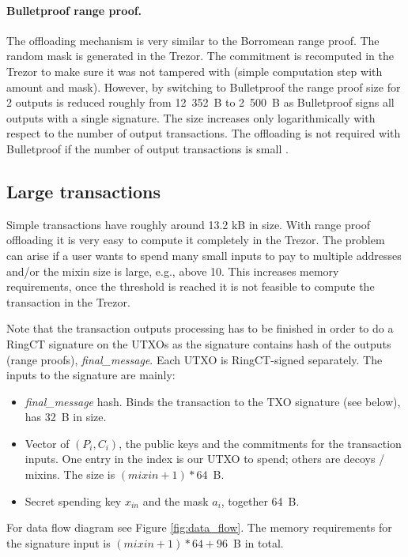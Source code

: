 \documentclass[]{article}
\begin{document}
\paragraph{Bulletproof range proof.} The offloading mechanism is very similar to the Borromean range proof. The random mask is generated in the Trezor. The commitment is recomputed in the Trezor to make sure it was not tampered with (simple computation step with amount and mask). 
However, by switching to Bulletproof the range proof size for 2 outputs is reduced roughly from 12~352~B to 2~500~B as Bulletproof signs all outputs with a single signature. The size increases only logarithmically with respect to the number of output transactions. The offloading is not required with Bulletproof if the number of output transactions is small \cite{Bnz2017BulletproofsSP}.

\subsection{Large transactions}
Simple transactions have roughly around 13.2 kB in size. With range proof offloading it is very easy to compute it completely in the Trezor. The problem can arise if a user wants to spend many small inputs to pay to multiple addresses and/or the mixin size is large, e.g., above 10. This increases memory requirements, once the threshold is reached it is not feasible to compute the transaction in the Trezor.

Note that the transaction outputs processing has to be finished in order to do a RingCT signature on the UTXOs as the signature contains hash of the outputs (range proofs), \emph{final\_message}. Each UTXO is RingCT-signed separately. The inputs to the signature are mainly:

\begin{itemize}
	\item \emph{final\_message} hash. Binds the transaction to the TXO signature (see below), has 32~B in size.
    \item Vector of $(P_i, C_i)$, the public keys and the commitments for the transaction inputs. One entry in the index is our UTXO to spend; others are decoys / mixins. The size is $(mixin+1) * 64$~B.
	\item Secret spending key $x_{in}$ and the mask $a_i$, together 64~B.
\end{itemize}
For data flow diagram see Figure \ref{fig:data_flow}.
The memory requirements for the signature input is $(mixin+1) * 64 + 96$~B in total.
\end{document}
